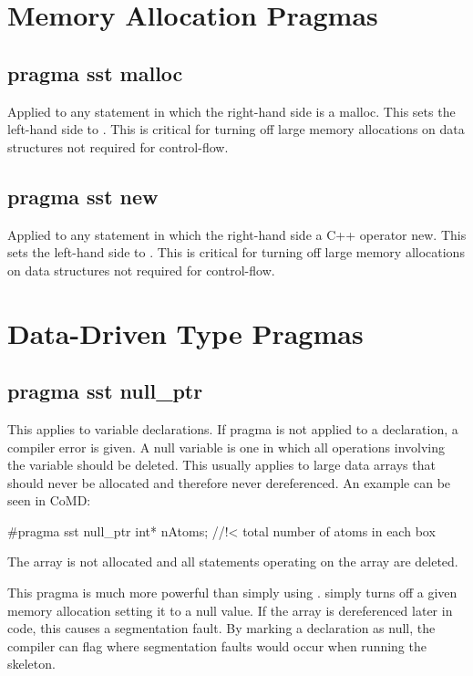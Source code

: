 \section{Memory Allocation Pragmas}
\subsection{pragma sst malloc}
Applied to any statement in which the right-hand side is a malloc. This sets the left-hand side to .
This is critical for turning off large memory allocations on data structures not required for control-flow.


\subsection{pragma sst new}
Applied to any statement in which the right-hand side a C++ operator new. This sets the left-hand side to .
This is critical for turning off large memory allocations on data structures not required for control-flow.

\section{Data-Driven Type Pragmas}
\subsection{pragma sst null\_ptr}
This applies to variable declarations. If pragma is not applied to a declaration, a compiler error is given.
A null variable is one in which all operations involving the variable should be deleted.
This usually applies to large data arrays that should never be allocated and therefore never dereferenced.
An example can be seen in CoMD:

\begin{CppCode}
#pragma sst null_ptr
   int* nAtoms;         //!< total number of atoms in each box
\end{CppCode}
The array is not allocated and all statements operating on the array are deleted.

This pragma is much more powerful than simply using .
 simply turns off a given memory allocation setting it to a null value.
If the array is dereferenced later in code, this causes a segmentation fault.
By marking a declaration as null, the compiler can flag where segmentation faults would occur when running the skeleton.

